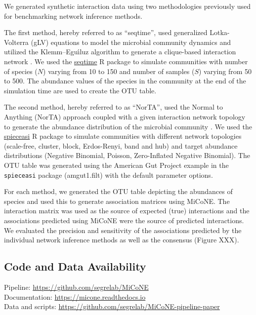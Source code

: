   We generated synthetic interaction data using two methodologies previously used for benchmarking network inference methods.

  The first method, hereby referred to as ``seqtime'', used generalized Lotka-Volterra (gLV) equations to model the microbial community dynamics and utilized the Klemm–Eguı́luz algorithm to generate a clique-based interaction network \cite{rottjersHairballsHypothesesBiological2018}. We used the \href{https://github.com/hallucigenia-sparsa/seqtime}{seqtime} R package to simulate communities with number of species (\(N\)) varying from 10 to 150 and number of samples (\(S\)) varying from 50 to 500. The abundance values of the species in the community at the end of the simulation time are used to create the OTU table.

  The second method, hereby referred to as ``NorTA'', used the Normal to Anything (NorTA) approach coupled with a given interaction network topology to generate the abundance distribution of the microbial community \cite{kurtzSparseCompositionallyRobust2015}. We used the \href{https://github.com/zdk123/SpiecEasi}{spieceasi} R package to simulate communities with different network topologies (scale-free, cluster, block, Erdos-Renyi, band and hub) and target abundance distributions (Negative Binomial, Poisson, Zero-Inflated Negative Binomial). The OTU table was generated using the American Gut Project example in the \texttt{spieceasi} package (amgut1.filt) with the default parameter options.

  For each method, we generated the OTU table depicting the abundances of species and used this to generate association matrices using MiCoNE. The interaction matrix was used as the source of expected (true) interactions and the associations predicted using MiCoNE were the source of predicted interactions. We evaluated the precision and sensitivity of the associations predicted by the individual network inference methods as well as the consensus (Figure XXX).

  \subsection*{Code and Data Availability}
  Pipeline: \href{https://github.com/segrelab/MiCoNE}{https://github.com/segrelab/MiCoNE} \\
  Documentation: \href{https://micone.readthedocs.io}{https://micone.readthedocs.io} \\
  Data and scripts: \href{https://github.com/segrelab/MiCoNE-pipeline-paper}{https://github.com/segrelab/MiCoNE-pipeline-paper}
